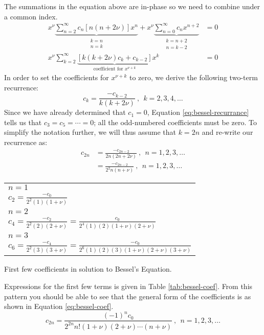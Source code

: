 The summations in the equation above are in-phase so we need to combine under a common index. 
\begin{align*}
x^{\nu}\underbrace{\sum\limits_{n=2}^{\infty}c_n[n(n+2\nu)]x^n}_{\substack{k=n \\ n=k}} + x^{\nu}\underbrace{\sum\limits_{n=0}^{\infty}c_nx^{n+2}}_{\substack{k=n+2 \\ n=k-2}} &= 0 \\
x^{\nu}\sum\limits_{k=2}^{\infty}\underbrace{\left[k(k+2\nu)c_k + c_{k-2}\right]}_{\text{coefficient for } x^{\nu+k}}x^{k} &= 0
\end{align*}
In order to set the coefficients for $x^{\nu+k}$ to zero, we derive the following two-term recurrence:
\begin{equation}
c_k = \frac{-c_{k-2}}{k(k+2\nu)} \ , \ \ k=2,3,4,\dots
\label{eq:bessel-recurrance}
\end{equation}
Since we have already determined that $c_1=0$, Equation \ref{eq:bessel-recurrance} tells us that $c_3=c_5=\cdots=0$; all the odd-numbered coefficients must be zero. To simplify the notation further, we will thus assume that $k=2n$ and re-write our recurrence as:
\begin{align*}
c_{2n} &= \frac{-c_{2n-2}}{2n(2n+2\nu)} \ , \ \ n=1,2,3,\dots \\
&=\frac{-c_{2n-2}}{2^2n(n+\nu)} \ , \ \ n=1,2,3,\dots
\end{align*}
\begin{margintable}
\begin{tabular}{|l|}
\hline
$n=1$ \\
$c_2 = \frac{-c_0}{2^2(1)(1+\nu)}$ \\\hline
$n=2$ \\
$c_4 = \frac{-c_2}{2^2 (2)(2+\nu)} = \frac{c_0}{2^4(1)(2)(1+\nu)(2+\nu)}$\\\hline
$n=3$ \\
$c_6 = \frac{-c_4}{2^2 (3)(3+\nu)} = \frac{-c_0}{2^6(1)(2)(3)(1+\nu)(2+\nu)(3+\nu)}$ \\\hline
\end{tabular}
\caption{First few coefficients in solution to Bessel's Equation.}
\label{tab:bessel-coef}
\end{margintable}
\noindent Expressions for the first few terms is given in Table \ref{tab:bessel-coef}. From this pattern you should be able to see that the general form of the coefficients is as shown in Equation \ref{eq:bessel-coef}.
\begin{equation}
c_{2n} = \frac{(-1)^n c_0}{2^{2n}n!(1+\nu)(2+\nu)\cdots(n+\nu)} \ , \ \ n=1,2,3,\dots
\label{eq:bessel-coef}
\end{equation}

